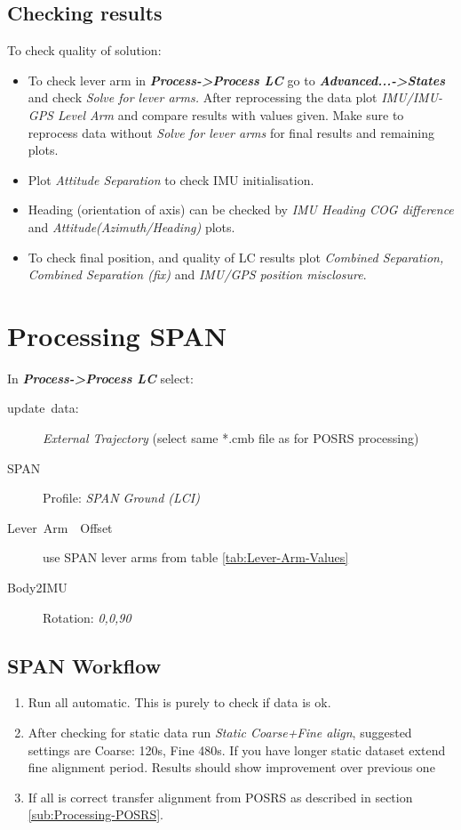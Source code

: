 \documentclass[british]{book}
\begin{document}
\subsection{Checking results}

To check quality of solution:

\begin{itemize}
	\item To check lever arm in \textbf{\emph{Process->Process LC}} go to \textbf{\emph{Advanced...->States }}and check\emph{ Solve for lever arms. }After reprocessing the data plot\emph{ IMU/IMU-GPS Level Arm} and compare results with values given. Make sure to reprocess data without \emph{Solve for lever arms }for final results and remaining plots.
	\item Plot \emph{Attitude Separation} to check IMU initialisation.
	\item Heading (orientation of axis) can be checked by \emph{IMU Heading COG difference} and \emph{Attitude(Azimuth/Heading)} plots.
	\item To check final position, and quality of LC results plot \emph{Combined Separation, Combined Separation (fix)} and\emph{ IMU/GPS position misclosure}. 
\end{itemize}

\section{Processing SPAN}\label{sub:Processing-SPAN}

In \textbf{\emph{Process->Process LC}} select:
\begin{description}
	\item [{update~data:}] \emph{External Trajectory }(select same {*}.cmb
	file as for POSRS processing)
	\item [{SPAN}] Profile: \emph{SPAN Ground (LCI) }
	\item [{Lever~Arm~~Offset}] use SPAN lever arms from table \ref{tab:Lever-Arm-Values}
	\item [{Body2IMU}] Rotation: \emph{0,0,90}
\end{description}

\subsection{SPAN Workflow\label{sub:SPAN-Workflow}}

\begin{enumerate}
\item Run all automatic. This is purely to check if data is ok.
\item After checking for static data run \emph{Static Coarse+Fine align}, suggested settings are Coarse: 120s, Fine 480s. If you have longer static dataset extend fine alignment period. Results should show improvement over previous one
\item If all is correct transfer alignment from POSRS as described in section \ref{sub:Processing-POSRS}.
\end{enumerate}
\end{document}
